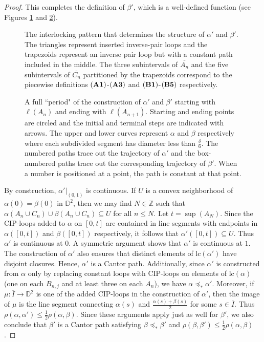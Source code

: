 \documentclass[10pt,a4paper]{amsart}
\newcommand{\bbd}{\mathbb{D}}
\newcommand{\bbz}{\mathbb{Z}}
\newcommand{\lc}{\text{lc}}
\newcommand{\ord}{\preceq_{\ast}}
\newcommand{\ov}{\overline}
\begin{document}
\begin{proof}
This completes the definition of $\beta '$, which is a well-defined function (see Figures \ref{fig3} and \ref{figconst}).
\begin{figure}[H]
\centering 
\caption{\label{fig3} The interlocking pattern that determines the structure of $\alpha '$ and $\beta '$. The triangles represent inserted inverse-pair loops and the trapezoids represent an inverse pair loop but with a constant path included in the middle.  The three subintervals of $\ov{A_n}$ and the five subintervals of $\ov{C_n}$ partitioned by the trapezoids correspond to the piecewise definitions ${\bf(A1)}$-$\bf {(A3)}$ and ${\bf(B1)}$-$\bf {(B5)}$ respectively.}
\end{figure}
\begin{figure}[H]
\centering 
\caption{\label{figconst} A full ``period" of the construction of $\alpha '$ and $\beta '$ starting with $\ell(A_n)$ and ending with $\ell(A_{n+1})$. Starting and ending points are circled and the initial and terminal steps are indicated with arrows. The upper and lower curves represent $\alpha$ and $\beta$ respectively where each subdivided segment has diameter less than $\frac{\delta}{6}$. The numbered paths trace out the trajectory of $\alpha'$ and the box-numbered paths trace out the corresponding trajectory of $\beta '$. When a number is positioned at a point, the path is constant at that point.}
\end{figure}

By construction, $\alpha '|_{(0,1)}$ is continuous. If $U$ is a convex neighborhood of $\alpha(0)=\beta(0)$ in $\bbd^2$, then we may find $N\in\bbz$ such that $\alpha(A_n\cup C_n)\cup \beta(A_n\cup C_n)\subseteq U$ for all $n\leq N$. Let $t=\sup(A_N)$. Since the CIP-loops added to $\alpha$ on $[0,t]$ are contained in line segments with endpoints in $\alpha([0,t])$ and $\beta([0,t])$ respectively, it follows that $\alpha '([0,t])\subseteq U$. Thus $\alpha '$ is continuous at $0$. A symmetric argument shows that $\alpha '$ is continuous at $1$. The construction of $\alpha '$ also ensures that distinct elements of $\lc(\alpha ')$ have disjoint closures. Hence, $\alpha '$ is a Cantor path. Additionally, since $\alpha '$ is constructed from  $\alpha$ only by replacing constant loops with CIP-loops on elements of $\lc(\alpha)$ (one on each $B_{n,j}$ and at least three on each $A_n$), we have $\alpha\ord \alpha '$. Moreover, if $\mu:\ov{I}\to \bbd^2$ is one of the added CIP-loops in the construction of $\alpha '$, then the image of $\mu$ is the line segment connecting $\alpha(s)$ and $\frac{\alpha(s)+\beta(s)}{2}$ for some $s\in \ov{I}$. Thus $\rho(\alpha,\alpha ')\leq \frac{1}{2}\rho(\alpha,\beta)$. Since these arguments apply just as well for $\beta '$, we also conclude that $\beta '$ is a Cantor path satisfying $\beta\ord\beta '$ and $\rho(\beta,\beta ')\leq \frac{1}{2}\rho(\alpha,\beta)$.


\end{proof}
\end{document}

